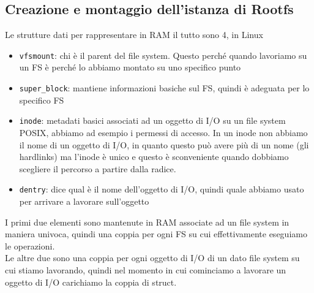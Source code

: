 \documentclass[12pt, oneside]{extbook}
\begin{document}
\subsection{Creazione e montaggio dell'istanza di Rootfs}
Le strutture dati per rappresentare in RAM il tutto sono 4, in Linux
\begin{itemize}
\item \texttt{vfsmount}: chi è il parent del file system. Questo perché quando lavoriamo su un FS è perché lo abbiamo montato su uno specifico punto
\item \texttt{super\_block}: mantiene informazioni basiche sul FS, quindi è adeguata per lo specifico FS
\item \texttt{inode}: metadati basici associati ad un oggetto di I/O su un file system POSIX, abbiamo ad esempio i permessi di accesso. In un inode non abbiamo il nome di un oggetto di I/O, in quanto questo può avere più di un nome (gli hardlinks) ma l'inode è unico e questo è sconveniente quando dobbiamo scegliere il percorso a partire dalla radice.
\item \texttt{dentry}: dice qual è il nome dell'oggetto di I/O, quindi quale abbiamo usato per arrivare a lavorare sull'oggetto
\end{itemize}
I primi due elementi sono mantenute in RAM associate ad un file system in maniera univoca, quindi una coppia per ogni FS su cui effettivamente eseguiamo le operazioni.\\Le altre due sono una coppia per ogni oggetto di I/O di un dato file system su cui stiamo lavorando, quindi nel momento in cui cominciamo a lavorare un oggetto di I/O carichiamo la coppia di struct.
\end{document}
